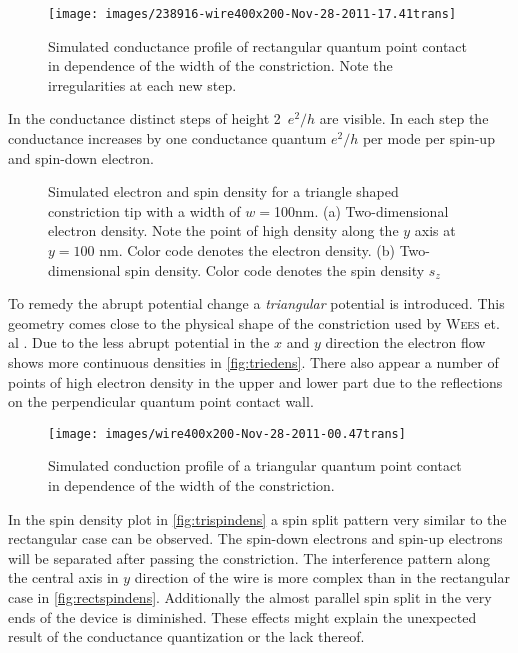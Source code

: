 \begin{figure}[h]
\centering
\texttt{[image: images/238916-wire400x200-Nov-28-2011-17.41trans]}
\caption{Simulated conductance profile of rectangular quantum point contact in dependence of the width of the constriction. Note the irregularities at each new step.}
\end{figure}
In the conductance distinct steps of height 2~$e^2/h$ are visible. In each step the conductance increases by one conductance quantum $e^2/h$ per mode per spin-up and spin-down electron.\par
\begin{figure}[h]
\caption{Simulated electron and spin density for a triangle shaped constriction tip with a width of $w=$100nm. (a) Two-dimensional electron density. Note the point of high density along the $y$ axis at $y=100$ nm. Color code denotes the electron density. (b) Two-dimensional spin density.  Color code denotes the spin density $s_z$}
\end{figure}
To remedy the abrupt potential change a \emph{triangular} potential is introduced. This geometry comes close to the physical shape of the constriction used by \textsc{Wees} et. al \cite{PhysRevLett.60.848}. Due to the less abrupt potential in the $x$ and $y$ direction the electron flow shows more continuous densities in \cref{fig:triedens}. There also appear a number of points of high electron density in the upper and lower part due to the reflections on the perpendicular quantum point contact wall.\par
\begin{figure}[h]
\centering
\texttt{[image: images/wire400x200-Nov-28-2011-00.47trans]}
\caption{Simulated conduction profile of a triangular quantum point contact in dependence of the width of the constriction.}\label{fig:tritrans}
\end{figure}
In the spin density plot in \cref{fig:trispindens} a spin split pattern very similar to the rectangular case can be observed. The spin-down electrons and spin-up electrons will be separated after passing the constriction. The interference pattern along the central axis in $y$ direction of the wire is more complex than in the rectangular case in \cref{fig:rectspindens}. Additionally the almost parallel spin split in the very ends of the device is diminished. These effects might explain the unexpected result of the conductance quantization or the lack thereof.
